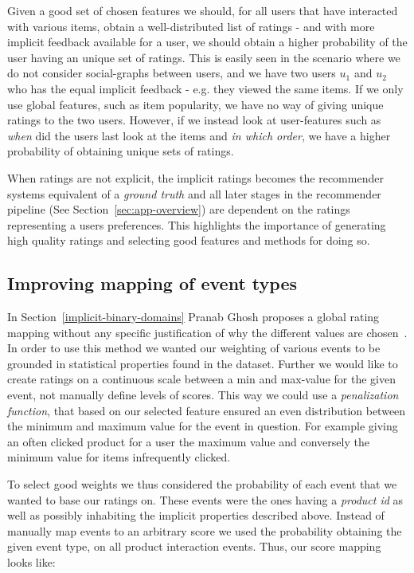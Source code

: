 Given a good set of chosen features we should, for all users that have
interacted with various items, obtain a well-distributed list of ratings - and
with more implicit feedback available for a user, we should obtain a higher
probability of the user having an unique set of ratings. This is easily seen in
the scenario where we do not consider social-graphs between users, and we have
two users $u_1$ and $u_2$ who has the equal implicit feedback - e.g. they
viewed the same items. If we only use global features, such as item popularity,
we have no way of giving unique ratings to the two users. However, if we
instead look at user-features such as \textit{when} did the users last look at
the items and \textit{in which order}, we have a higher probability of
obtaining unique sets of ratings.

When ratings are not explicit, the implicit ratings becomes the recommender
systems equivalent of a \textit{ground truth} and all later stages in the
recommender pipeline (See Section~\ref{sec:app-overview}) are dependent on the
ratings representing a users preferences. This highlights the importance of
generating high quality ratings and selecting good features and methods for
doing so.

\subsection{Improving mapping of event types}

In Section~\ref{implicit-binary-domains} Pranab Ghosh proposes a global rating
mapping without any specific justification of why the different values are
chosen~\cite{pkghost2014implicit}. In order to use this method we wanted our
weighting of various events to be grounded in statistical properties found in
the dataset. Further we would like to create ratings on a continuous scale
between a min and max-value for the given event, not manually define levels of
scores. This way we could use a \textit{penalization function}, that based on
our selected feature ensured an even distribution between the minimum and
maximum value for the event in question. For example giving an often clicked
product for a user the maximum value and conversely the minimum value for
items infrequently clicked.

To select good weights we thus considered the probability of each event that we
wanted to base our ratings on. These events were the ones having a
\textit{product id} as well as possibly inhabiting the implicit properties
described above. Instead of manually map events to an arbitrary score we used
the probability obtaining the given event type, on all product interaction
events. Thus, our score mapping looks like:


